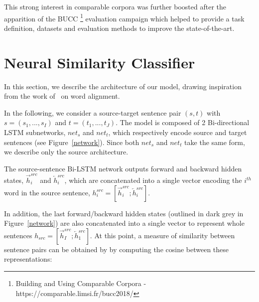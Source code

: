 \documentclass[11pt,a4paper]{article}
\begin{document}

This strong interest in comparable corpora was further boosted after
the apparition of the BUCC \footnote{Building and Using Comparable
  Corpora  - https://comparable.limsi.fr/bucc2018/} evaluation
campaign which helped to provide a task definition, datasets and
evaluation methods to improve the state-of-the-art. 

\section{Neural Similarity Classifier}
\label{sec:similarity}

In this section, we describe the architecture of our model, drawing
inspiration from the work of~\citet{W16-2207} on word alignment.

 
In the following, we consider a source-target sentence pair $(s,t)$
with $s=(s_1,...,s_I)$ and $t=(t_1,...,t_J)$. The model is composed of
2 Bi-directional LSTM subnetworks, $net_s$ and $net_t$, which
respectively encode source and target sentences (see Figure~\ref{network}). Since both $net_s$ and $net_t$ take the same form, we describe only the source architecture.

The source-sentence Bi-LSTM network outputs forward and backward hidden states, $\overrightarrow{h}^{src}_i$ and $\overleftarrow{h}^{src}_i$, which are concatenated into a single vector encoding the $i^{th}$ word in the source sentence, 
$h^{src}_i = [ \overrightarrow{h}^{src}_i ; \overleftarrow{h}^{src}_i ]$.

In addition, the last forward/backward hidden states (outlined in dark grey in Figure~\ref{network}) are also concatenated into a single vector to represent whole sentences 
$h_{src} = [ \overrightarrow{h}^{src}_I ; \overleftarrow{h}^{src}_1 ]$.
At this point, a measure of similarity between sentence pairs can be
obtained by by computing the cosine between these representations: 
\end{document}
